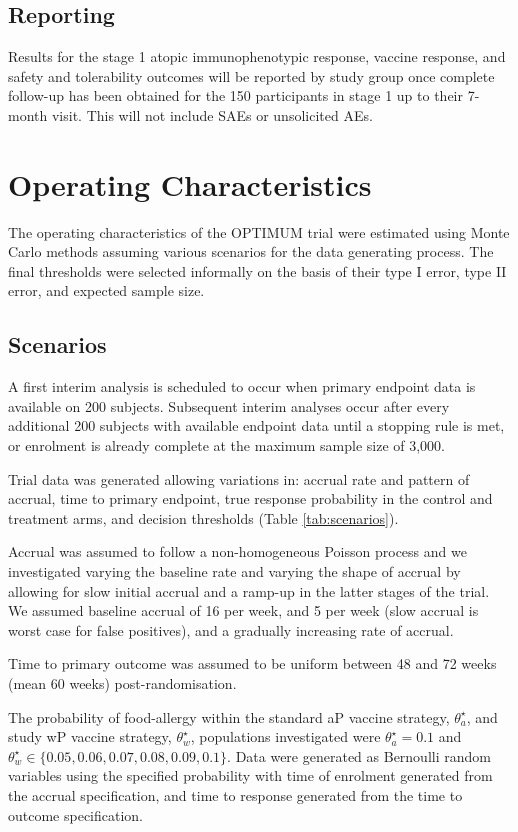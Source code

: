 \documentclass{bmcart}
\begin{document}
\subsection*{Reporting}

Results for the stage 1 atopic immunophenotypic response, vaccine response, and safety and tolerability outcomes will be reported by study group once complete follow-up has been obtained for the 150 participants in stage 1 up to their 7-month visit. This will not include SAEs or unsolicited AEs.

\section*{Operating Characteristics}

The operating characteristics of the OPTIMUM trial were estimated using Monte Carlo methods assuming 
various scenarios for the data generating process. 
The final thresholds were selected informally on the basis of their type I error, type II error, and expected sample size.

\subsection*{Scenarios}

A first interim analysis is scheduled to occur when primary endpoint data is available on 200 subjects.
Subsequent interim analyses occur after every additional 200 subjects with available endpoint data until a stopping rule is met, or enrolment is already complete at the maximum sample size of 3,000.

Trial data was generated allowing variations in: accrual rate and pattern of accrual, time to primary endpoint, true response probability in the control and treatment arms, and decision thresholds (Table \ref{tab:scenarios}).

Accrual was assumed to follow a non-homogeneous Poisson process and we investigated varying the baseline rate and varying the shape of accrual by allowing for slow initial accrual and a ramp-up in the latter stages of the trial.
We assumed baseline accrual of 16 per week, and 5 per week (slow accrual is worst case for false positives), and a gradually increasing rate of accrual.

Time to primary outcome was assumed to be uniform between 48 and 72 weeks (mean 60 weeks) post-randomisation.

The probability of food-allergy within the standard aP vaccine strategy, $\theta_a^\star$, and study wP vaccine strategy, $\theta_w^\star$, populations investigated were $\theta_a^\star=0.1$ and $\theta_w^\star\in\{0.05, 0.06, 0.07, 0.08, 0.09,0.1\}$.
Data were generated as Bernoulli random variables using the specified probability with time of enrolment generated from the accrual specification, and time to response generated from the time to outcome specification.
\end{document}
